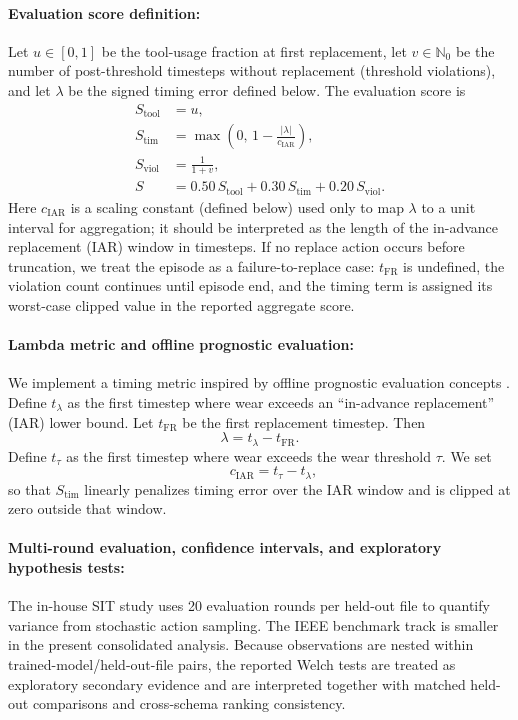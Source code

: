 \documentclass[sn-basic]{sn-jnl} %
\begin{document}
\paragraph{Evaluation score definition:}
Let $u\in[0,1]$ be the tool-usage fraction at first replacement, let $v\in\mathbb{N}_0$ be the number of post-threshold timesteps without replacement (threshold violations), and let $\lambda$ be the signed timing error defined below. The evaluation score is
\begin{align}
	S_{\text{tool}} &= u,\\
	S_{\text{tim}} &= \max\left(0,\,1-\frac{|\lambda|}{c_{\mathrm{IAR}}}\right),\\
	S_{\text{viol}} &= \frac{1}{1+v},\\
	S &= 0.50\,S_{\text{tool}} + 0.30\,S_{\text{tim}} + 0.20\,S_{\text{viol}}.
\end{align}
Here $c_{\mathrm{IAR}}$ is a scaling constant (defined below) used only to map $\lambda$ to a unit interval for aggregation; it should be interpreted as the length of the in-advance replacement (IAR) window in timesteps. If no replace action occurs before truncation, we treat the episode as a failure-to-replace case: $t_{\mathrm{FR}}$ is undefined, the violation count continues until episode end, and the timing term is assigned its worst-case clipped value in the reported aggregate score.

\paragraph{Lambda metric and offline prognostic evaluation:}
We implement a timing metric inspired by offline prognostic evaluation concepts \cite{Saxena2010Metrics}. Define $t_{\lambda}$ as the first timestep where wear exceeds an ``in-advance replacement'' (IAR) lower bound. Let $t_{\mathrm{FR}}$ be the first replacement timestep. Then
\begin{equation}
		\lambda = t_{\lambda} - t_{\mathrm{FR}}.
\end{equation}
Define $t_{\tau}$ as the first timestep where wear exceeds the wear threshold $\tau$. We set
\begin{equation}
\qquad c_{\mathrm{IAR}} = t_{\tau}-t_{\lambda},
\end{equation}
so that $S_{\text{tim}}$ linearly penalizes timing error over the IAR window and is clipped at zero outside that window.

\paragraph{Multi-round evaluation, confidence intervals, and exploratory hypothesis tests:}
The in-house SIT study uses 20 evaluation rounds per held-out file to quantify variance from stochastic action sampling. The IEEE benchmark track is smaller in the present consolidated analysis. Because observations are nested within trained-model/held-out-file pairs, the reported Welch tests are treated as exploratory secondary evidence and are interpreted together with matched held-out comparisons and cross-schema ranking consistency.
\end{document}
